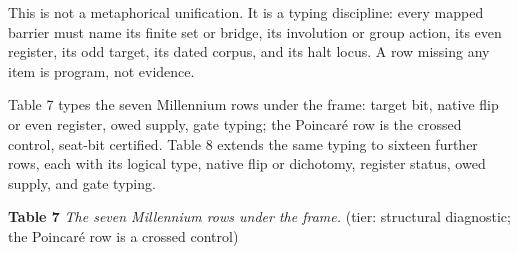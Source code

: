 \documentclass[10pt]{article}
\renewcommand{\_}{\origunderscore\allowbreak}
\begin{document}
This is not a metaphorical unification. It is a typing discipline: every
mapped barrier must name its finite set or bridge, its involution or
group action, its even register, its odd target, its dated corpus, and
its halt locus. A row missing any item is program, not evidence.

Table 7 types the seven Millennium rows under the frame: target bit,
native flip or even register, owed supply, gate typing; the Poincaré row
is the crossed control, seat-bit certified. Table 8 extends the same
typing to sixteen further rows, each with its logical type, native flip
or dichotomy, register status, owed supply, and gate typing.

\textbf{Table 7 \textbar{}} \emph{The seven Millennium rows under the
frame.} (tier: structural diagnostic; the Poincaré row is a crossed
control)
\end{document}
